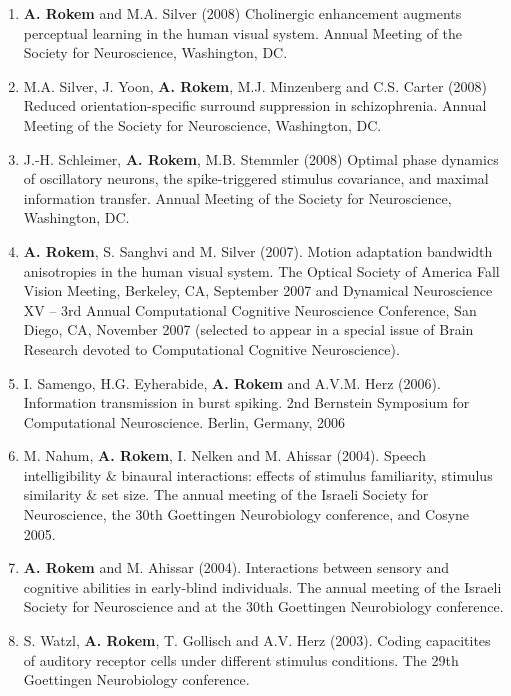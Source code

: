 \documentclass[11pt,fullpage]{article}
\begin{document}
\begin{enumerate}
\item {\bf A. Rokem} and M.A. Silver (2008) Cholinergic enhancement augments perceptual learning in the human visual system. Annual Meeting of the Society for Neuroscience, Washington, DC.

\item M.A. Silver, J. Yoon, {\bf A. Rokem}, M.J. Minzenberg and C.S. Carter (2008) Reduced orientation-specific surround suppression in schizophrenia. Annual Meeting of the Society for Neuroscience, Washington, DC.

\item J.-H. Schleimer, {\bf A. Rokem}, M.B. Stemmler (2008) Optimal phase dynamics of oscillatory neurons, the spike-triggered stimulus covariance, and maximal information transfer. Annual Meeting of the Society for Neuroscience, Washington, DC.

\item {\bf A. Rokem}, S. Sanghvi and M. Silver (2007). Motion adaptation bandwidth anisotropies in the human visual system. The Optical Society of America Fall Vision Meeting, Berkeley, CA, September 2007 and Dynamical Neuroscience XV – 3rd Annual Computational Cognitive Neuroscience Conference, San Diego, CA, November 2007 (selected to appear in a special issue of Brain Research devoted to Computational Cognitive Neuroscience).

\item I. Samengo, H.G. Eyherabide, {\bf A. Rokem} and A.V.M. Herz (2006). Information transmission in burst spiking. 2nd Bernstein Symposium for Computational Neuroscience. Berlin, Germany, 2006

\item M. Nahum, {\bf A. Rokem}, I. Nelken and M. Ahissar (2004). Speech intelligibility \& binaural interactions: effects of stimulus familiarity, stimulus similarity \& set size. The annual meeting of the Israeli Society for Neuroscience, the 30th Goettingen Neurobiology conference, and Cosyne 2005.

\item {\bf A. Rokem} and M. Ahissar (2004). Interactions between sensory and cognitive abilities in early-blind individuals. The annual meeting of the Israeli Society for Neuroscience and at the 30th Goettingen Neurobiology conference.

\item S. Watzl, {\bf A. Rokem}, T. Gollisch and A.V. Herz (2003). Coding capacitites of auditory receptor cells under different stimulus conditions. The 29th Goettingen Neurobiology conference.
\end{enumerate}
\end{document}
